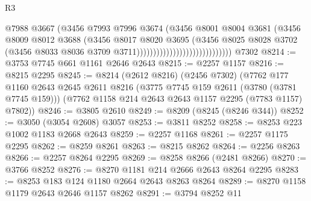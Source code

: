 \begin{lexlean}{R3}
\begin{coremodule}
                                                  @7988
                                                  @3667
                                                  (@3456
                                                    @7993
                                                    @7996
                                                    @3674
                                                    (@3456
                                                      @8001
                                                      @8004
                                                      @3681
                                                      (@3456
                                                        @8009
                                                        @8012
                                                        @3688
                                                        (@3456
                                                          @8017
                                                          @8020
                                                          @3695
                                                          (@3456
                                                            @8025
                                                            @8028
                                                            @3702
                                                            (@3456
                                                              @8033
                                                              @8036
                                                              @3709
                                                              @3711)))))))))))))))))))))))))))))
    @7302
@8214 := @3753 @7745 @661 @1161 @2646 @2643
@8215 := @2257 @1157
@8216 := @8215 @2295
@8245 := @8214
    (@2612 @8216)
    (@2456 @7302)
    (@7762
      @177
      @1160
      @2643
      @2645
      @2611
      @8216
      (@3775 @7745 @159 @2611 (@3780 (@3781 @7745 @159)))
      (@7762 @1158 @214 @2643 @2643 @1157 @2295 (@7783 @1157) @7802))
@8246 := @3805 @2610
@8249 := @8209 (@8245 (@8246 @344))
@8252 := @3050 (@3054 @2608) @3057
@8253 := @3811 @8252
@8258 := @8253 @223 @1002 @1183 @2668 @2643
@8259 := @2257 @1168
@8261 := @2257 @1175 @2295
@8262 := @8259 @8261
@8263 := @8215 @8262
@8264 := @2256 @8263
@8266 := @2257 @8264 @2295
@8269 := @8258 @8266 (@2481 @8266)
@8270 := @3766 @8252
@8276 := @8270 @1181 @214 @2666 @2643 @8264 @2295
@8283 := @8253 @183 @124 @1180 @2664 @2643 @8263 @8264
@8289 := @8270 @1158 @1179 @2643 @2646 @1157 @8262
@8291 := @3794 @8252 @11

\end{coremodule}
\end{lexlean}
